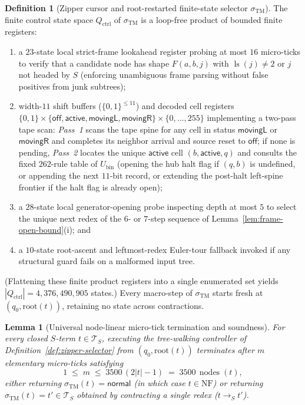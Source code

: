 \documentclass[11pt,reqno]{amsart}
\numberwithin{equation}{section}
\theoremstyle{plain}
\newtheorem{lemma}[theorem]{Lemma}
\theoremstyle{definition}
\newtheorem{definition}[theorem]{Definition}
\theoremstyle{remark}
\DeclareMathOperator{\nodes}{nodes}
\DeclareMathOperator{\ls}{ls}
\newcommand{\TS}{\mathcal{T}_S}
\newcommand{\NF}{\mathrm{NF}}
\newcommand{\redS}{\to_S}
\begin{document}
\begin{definition}[Zipper cursor and root-restarted finite-state selector $\sigma_{\mathrm{TM}}$]
The finite control state space $Q_{\mathrm{ctrl}}$ of $\sigma_{\mathrm{TM}}$ is a loop-free product of bounded finite registers:
\begin{enumerate}[label=(\roman*),leftmargin=2.2em]
  \item a $23$-state local strict-frame lookahead register probing at most $16$ micro-ticks to verify that a candidate node has shape $F(a,b,j)$ with $\ls(j) \ne 2$ or $j$ not headed by $S$ (enforcing unambiguous frame parsing without false positives from junk subtrees);
  \item width-$11$ shift buffers ($\{0,1\}^{\le 11}$) and decoded cell registers $\{0,1\} \times \{\mathsf{off}, \mathsf{active}, \mathsf{movingL}, \mathsf{movingR}\} \times \{0,\dots,255\}$ implementing a two-pass tape scan: \emph{Pass~1} scans the tape spine for any cell in status $\mathsf{movingL}$ or $\mathsf{movingR}$ and completes its neighbor arrival and source reset to $\mathsf{off}$; if none is pending, \emph{Pass~2} locates the unique $\mathsf{active}$ cell $(b, \mathsf{active}, q)$ and consults the fixed $262$-rule table of $U_{\mathrm{bin}}$ (opening the hub halt flag if $(q, b)$ is undefined, or appending the next $11$-bit record, or extending the post-halt left-spine frontier if the halt flag is already open);
  \item a $28$-state local generator-opening probe inspecting depth at most $5$ to select the unique next redex of the $6$- or $7$-step sequence of Lemma~\ref{lem:frame-open-bound}(i); and
  \item a $10$-state root-ascent and leftmost-redex Euler-tour fallback invoked if any structural guard fails on a malformed input tree.
\end{enumerate}
(Flattening these finite product registers into a single enumerated set yields $|Q_{\mathrm{ctrl}}| = 4{,}376{,}490{,}905$ states.) Every macro-step of $\sigma_{\mathrm{TM}}$ starts fresh at $(q_0, \mathrm{root}(t))$, retaining no state across contractions.
\end{definition}

\begin{lemma}[Universal node-linear micro-tick termination and soundness]\label{lem:microtick-bound}
For every closed $S$-term $t \in \TS$, executing the tree-walking controller of Definition~\ref{def:zipper-selector} from $(q_0, \mathrm{root}(t))$ terminates after $m$ elementary micro-ticks satisfying
\begin{equation}\label{eq:microtick-bound}
  1 \;\le\; m \;\le\; 3500\,(2|t| - 1) \;=\; 3500\,\nodes(t),
\end{equation}
either returning $\sigma_{\mathrm{TM}}(t) = \mathsf{normal}$ (in which case $t \in \NF$) or returning $\sigma_{\mathrm{TM}}(t) = t' \in \TS$ obtained by contracting a single redex ($t \redS t'$).
\end{lemma}
\end{document}
